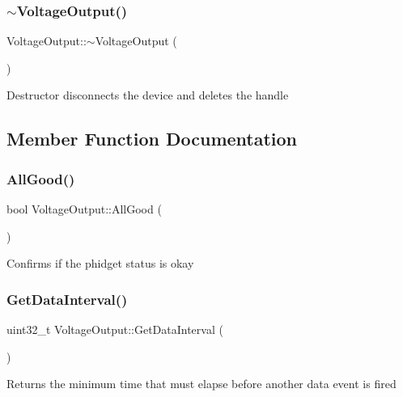 \subsubsection{\texorpdfstring{$\sim$\+Voltage\+Output()}{~VoltageOutput()}}
{\footnotesize\ttfamily Voltage\+Output\+::$\sim$\+Voltage\+Output (\begin{DoxyParamCaption}{ }\end{DoxyParamCaption})\hspace{0.3cm}{\ttfamily [inline]}}

Destructor disconnects the device and deletes the handle

\subsection{Member Function Documentation}
\mbox{\label{classVoltageOutput_a776a9b2fbb8de116ff2309f68f44f95a}} 
\subsubsection{\texorpdfstring{All\+Good()}{AllGood()}}
{\footnotesize\ttfamily bool Voltage\+Output\+::\+All\+Good (\begin{DoxyParamCaption}{ }\end{DoxyParamCaption})\hspace{0.3cm}{\ttfamily [inline]}}

Confirms if the phidget status is okay\mbox{\label{classVoltageOutput_a0b2c89409dddac6283ac3914b4780b4e}} 
\subsubsection{\texorpdfstring{Get\+Data\+Interval()}{GetDataInterval()}}
{\footnotesize\ttfamily uint32\+\_\+t Voltage\+Output\+::\+Get\+Data\+Interval (\begin{DoxyParamCaption}{ }\end{DoxyParamCaption})\hspace{0.3cm}{\ttfamily [inline]}}

Returns the minimum time that must elapse before another data event is fired\mbox{\label{classVoltageOutput_a15385564cb794f9f721d569744a75324}} 
